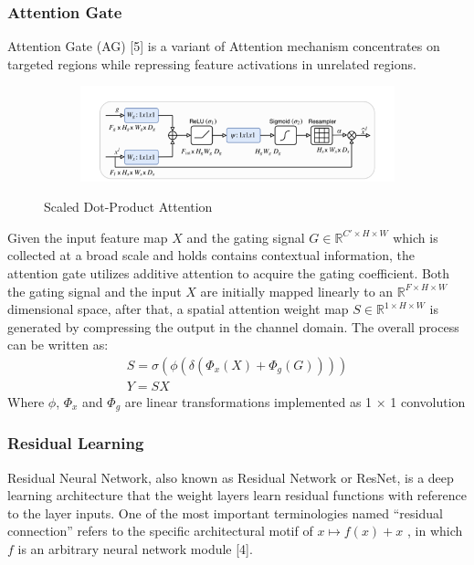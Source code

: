 \documentclass[conference]{IEEEtran}
\begin{document}
\subsubsection{Attention Gate}
Attention Gate (AG) [5] is a variant of Attention mechanism concentrates on targeted regions while repressing feature activations in unrelated regions.
\begin{figure}[h]
    \centering
    \begin{subfigure}[t]{0.5\textwidth}
        \centering
        \includegraphics[width=\textwidth]{group/Picture4.png}
    \end{subfigure}%
    \caption{Scaled Dot-Product Attention}
\end{figure}
Given the input feature map $X$ and the gating signal $G\in\mathbb{R}^{C'\times H\times W}$ which is collected at a broad scale and holds contains contextual information, the attention gate utilizes additive attention to acquire the gating coefficient. Both the gating signal and the input $X$ are initially mapped linearly to an $\mathbb{R}^{F\times H \times W}$ dimensional space, after that, a spatial attention weight map $S\in\mathbb{R}^{1\times H\times W}$ is generated by compressing the output in the channel domain.
The overall process can be written as:
\begin{gather*}
    S=\sigma(\phi(\delta(\Phi_x(X)+\Phi_g (G))))\\
    Y=SX
\end{gather*}
Where $\phi$, $\Phi_x$ and $\Phi_g$ are linear transformations implemented as 1 × 1 convolution
\subsubsection{Residual Learning}
Residual Neural Network, also known as Residual Network or ResNet, is a deep learning architecture that the weight layers learn residual functions with reference to the layer inputs. One of the most important terminologies named “residual connection” refers to the specific architectural motif of $x\mapsto f(x)+x$ , in which $f$ is an arbitrary neural network module [4].
\end{document}
